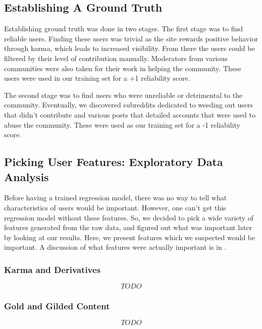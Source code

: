 \subsection{Establishing A Ground Truth} %
\label{sub:establishing_a_ground_truth}
Establishing ground truth was done in two stages. The first stage was to find
reliable users. Finding these users was trivial as the site rewards positive
behavior through karma, which leads to increased visibility. From there the
users could be filtered by their level of contribution manually. Moderators from
various communities were also taken for their work in helping the community.
These users were used in our training set for a +1 reliability score.

The second stage was to find users who were unreliable or detrimental to the
community. Eventually, we discovered subreddits dedicated to weeding out users
that didn't contribute and various posts that detailed accounts that were used
to abuse the community. These were used as our training set for a -1 reliability
score.


\subsection{Picking User Features: Exploratory Data Analysis} %
\label{sub:picking_user_features}

Before having a trained regression model, there was no way to tell what
characteristics of \reddit{} users would be important. However, one can't get
this regression model without these features. So, we decided to pick a wide
variety of features generated from the raw data, and figured out what was
important later by looking at our results. Here, we present features which we
suspected would be important. A discussion of what features were actually
important is in .

\subsubsection{\reddit{} Karma and Derivatives} %
\label{ssub:reddit_karma_and_derivatives}
\[TODO\]

\subsubsection{\reddit{} Gold and Gilded Content} %
\label{ssub:reddit_gold_and_gilded_content}
\[TODO\]


